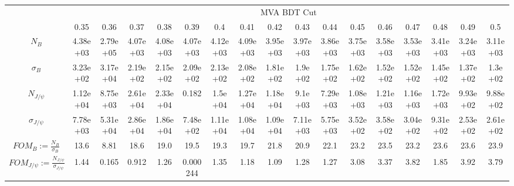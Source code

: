 \begin{table}[!h]
\centering
\begin{adjustbox}{width=18cm, rotate=90}
\centering
\begin{tabular}{*{1}{c|}*{16}{c}}
& \multicolumn{16}{c}{MVA BDT Cut}\\
& 0.35& 0.36& 0.37& 0.38& 0.39& 0.4& 0.41& 0.42& 0.43& 0.44& 0.45& 0.46& 0.47& 0.48& 0.49& 0.5\\ \hline
$N_B$& 4.38e+03& 2.79e+05& 4.07e+03& 4.08e+03& 4.07e+03& 4.12e+03& 4.09e+03& 3.95e+03& 3.97e+03& 3.86e+03& 3.75e+03& 3.58e+03& 3.53e+03& 3.41e+03& 3.24e+03& 3.11e+03\\
$\sigma_B$& 3.23e+02& 3.17e+04& 2.19e+02& 2.15e+02& 2.09e+02& 2.13e+02& 2.08e+02& 1.81e+02& 1.9e+02& 1.75e+02& 1.62e+02& 1.52e+02& 1.52e+02& 1.45e+02& 1.37e+02& 1.3e+02\\
$N_{J/\psi}$& 1.12e+04& 8.75e+03& 2.61e+04& 2.33e+04& 0.182& 1.5e+04& 1.27e+04& 1.18e+04& 9.1e+03& 7.29e+03& 1.08e+03& 1.21e+03& 1.16e+03& 1.72e+03& 9.93e+02& 9.88e+02\\
$\sigma_{J/\psi}$& 7.78e+03& 5.31e+04& 2.86e+04& 1.86e+04& 7.48e+02& 1.11e+04& 1.08e+04& 1.09e+04& 7.11e+03& 5.75e+03& 3.52e+02& 3.58e+02& 3.04e+02& 9.31e+02& 2.53e+02& 2.61e+02\\ \hline
$FOM_{B}:=\frac{N_B}{\sigma_B}$& 13.6& 8.81& 18.6& 19.0& 19.5& 19.3& 19.7& 21.8& 20.9& 22.1& 23.2& 23.5& 23.2& 23.6& 23.6& 23.9\\
$FOM_{J/\psi}:=\frac{N_{J/\psi}}{\sigma_{J/\psi}}$& 1.44& 0.165& 0.912& 1.26& 0.000244& 1.35& 1.18& 1.09& 1.28& 1.27& 3.08& 3.37& 3.82& 1.85& 3.92& 3.79\\ \hline
\end{tabular}
\end{adjustbox}
\end{table}
